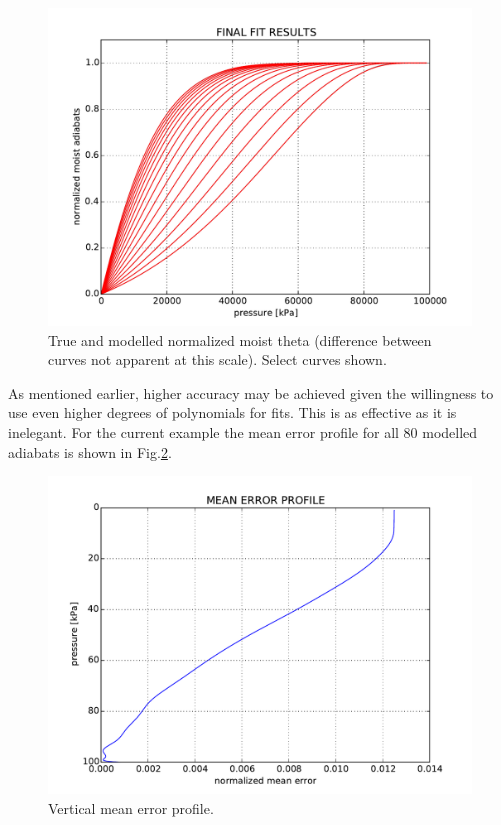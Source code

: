 \documentclass{article}
\begin{document}
\begin{figure}
\centering
\includegraphics[width=4.5in]{../figs/final_fit.pdf}
\caption{True and modelled normalized moist theta (difference between curves not apparent at this scale). Select curves shown.}\label{final_fit}
\end{figure}

As mentioned earlier, higher accuracy may be achieved given the willingness to use even higher degrees of polynomials for fits. This is as effective as it is inelegant. For the current example the mean error profile for all 80 modelled adiabats is shown in Fig.\ref{error}.

\begin{figure}
\centering
\includegraphics[width=4.5in]{../figs/error_profile.pdf}
\caption{Vertical mean error profile.}\label{error}
\end{figure}
\end{document}
